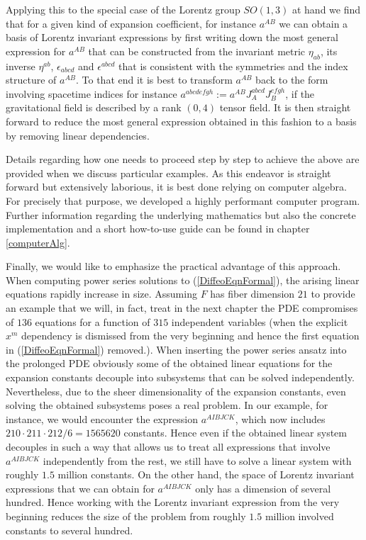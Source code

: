Applying this to the special case of the Lorentz group $SO(1,3)$ at hand we find that for a given kind of expansion coefficient, for instance $a^{AB}$ we can obtain a basis of Lorentz invariant expressions by first writing down the most general expression for $a^{AB}$ that can be constructed from the invariant metric $\eta_{ab}$, its inverse $\eta^{ab}$, $\epsilon_{abcd}$ and $\epsilon^{abcd}$ that is consistent with the symmetries and the index structure of $a^{AB}$. To that end it is best to transform $a^{AB}$ back to the form involving spacetime indices for instance $a^{abcdefgh} := a^{AB}J_A^{abcd}J_B^{efgh}$, if the gravitational field is described by a rank $(0,4)$ tensor field. It is then straight forward to reduce the most general expression obtained in this fashion to a basis by removing linear dependencies.

Details regarding how one needs to proceed step by step to achieve the above are provided when we discuss particular examples. As this endeavor is straight forward but extensively laborious, it is best done relying on computer algebra. For precisely that purpose, we developed a highly performant computer program. 
Further information regarding the underlying mathematics but also the concrete implementation and a short how-to-use guide can be found in chapter \ref{computerAlg}. 

Finally, we would like to emphasize the practical advantage of this approach. When computing power series solutions to (\ref{DiffeoEqnFormal}), the arising linear equations rapidly increase in size. Assuming $F$ has fiber dimension $21$ to provide an example that we will, in fact, treat in the next chapter the PDE compromises of $136$ equations for a function of $315$ independent variables (when the explicit $x^m$ dependency is dismissed from the very beginning and hence the first equation in (\ref{DiffeoEqnFormal}) removed.).  When inserting the power series ansatz into the prolonged PDE obviously some of the obtained linear equations for the expansion constants decouple into subsystems that can be solved independently. Nevertheless, due to the sheer dimensionality of the expansion constants, even solving the obtained subsystems poses a real problem. In our example, for instance, we would encounter the expression $a^{AIBJCK}$, which now includes $210\cdot 211\cdot212/6=1565620$ constants. Hence even if the obtained linear system decouples in such a way that allows us to treat all expressions that involve $a^{AIBJCK}$ independently from the rest, we still have to solve a linear system with roughly $1.5$ million constants. On the other hand, the space of Lorentz invariant expressions that we can obtain for $a^{AIBJCK}$ only has a dimension of several hundred. Hence working with the Lorentz invariant expression from the very beginning reduces the size of the problem from roughly $1.5$ million involved constants to several hundred. 

